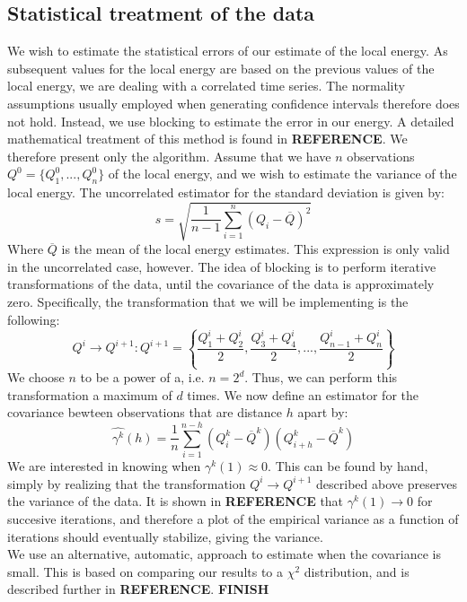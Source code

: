 \documentclass[a4paper, 10pt]{article}
\begin{document}
	\subsection{Statistical treatment of the data}
	We wish to estimate the statistical errors of our estimate of the local energy. As subsequent values for the local energy are based on the previous values of the local energy, we are dealing with a correlated time series. The normality assumptions usually employed when generating confidence intervals therefore does not hold. Instead, we use blocking to estimate the error in our energy. A detailed mathematical treatment of this method is found in \textbf{REFERENCE}. We therefore present only the algorithm. Assume that we have $n$ observations $Q^0=\{Q_1^0,...,Q_n^0\}$ of the local energy, and we wish to estimate the variance of the local energy. The uncorrelated estimator for the standard deviation is given by:
	\begin{equation}
	s=\sqrt{\frac{1}{n-1}\sum_{i=1}^n (Q_i-\overline{Q})^2}
	\end{equation}
	Where $\overline{Q}$ is the mean of the local energy estimates. This expression is only valid in the uncorrelated case, however. The idea of blocking is to perform iterative transformations of the data, until the covariance of the data is approximately zero. Specifically, the transformation that we will be implementing is the following:
	\begin{equation}
	Q^i \rightarrow Q^{i+1}: Q^{i+1} = \left\{ \frac{Q^i_1+Q^i_2}{2}, \frac{Q^i_3+Q^i_4}{2},...,\frac{Q^i_{n-1}+Q^i_{n}}{2}\right\}
	\end{equation}
	We choose $n$ to be a power of a, i.e. $n=2^d$. Thus, we can perform this transformation a maximum of $d$ times. We now define an estimator for the covariance bewteen observations that are distance $h$ apart by:
	\begin{equation}
	\hat{\gamma^k}(h)=\frac{1}{n}\sum_{i=1}^{n-h}(Q_i^k-\overline{Q}^k)(Q_{i+h}^k-\overline{Q}^k)
	\end{equation}
	We are interested in knowing when $\gamma^k(1)\approx 0$. This can be found by hand, simply by realizing that the transformation $Q^i \rightarrow Q^{i+1}$ described above preserves the variance of the data. It is shown in \textbf{REFERENCE} that $\gamma^k(1) \rightarrow 0$ for succesive iterations, and therefore a plot of the empirical variance as a function of iterations should eventually stabilize, giving the variance. \\
	\linebreak
	We use an alternative, automatic, approach to estimate when the covariance is small. This is based on comparing our results to a $\chi^2$ distribution, and is described further in \textbf{REFERENCE}.
	\textbf{FINISH}
\end{document}
